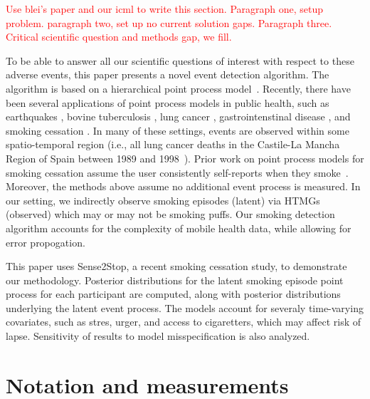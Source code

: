 \documentclass[11pt]{amsart}
\begin{document}
\textcolor{red}{Use blei's paper and our icml to write this
  section. Paragraph one, setup problem. paragraph two, set up no
  current solution gaps. Paragraph three. Critical scientific question
  and methods gap, we fill.}

To be able to answer all our scientific questions of interest with
respect to these adverse events, this paper presents a novel event
detection algorithm. The algorithm is based on a hierarchical point
process model~\cite{Blei, DempseyICML}.  Recently, there have been
several applications of point process models in public health, such as
earthquakes \cite{RevMCMCguys}, bovine tuberculosis
\cite{DiggleStatSci}, lung cancer \cite{DiggleStatSci},
gastrointenstinal disease \cite{DiggleStatSci}, and smoking cessation
\cite{MLHealth paper}.
In many of these settings, events are observed within some
spatio-temporal region (i.e., all lung cancer deaths in the Castile-La
Mancha Region of Spain between 1989 and 1998~\cite{DiggleStatSci}).
Prior work on point process models for smoking cessation assume the
user consistently self-reports when they smoke~\cite{MLHealth}.
Moreover, the methods above assume no additional event process is
measured.
In our setting, we indirectly observe smoking episodes (latent) via
HTMGs (observed) which may or may not be smoking puffs.
Our smoking detection algorithm accounts for the complexity of mobile
health data, while allowing for error propogation.

This paper uses Sense2Stop, a recent smoking cessation study, to
demonstrate our methodology.  Posterior distributions for the latent
smoking episode point process for each participant are computed, along
with posterior distributions underlying the latent event process.
The models account for severaly time-varying covariates, such as
stres, urger, and access to cigaretters, which may affect risk of
lapse. Sensitivity of results to model misspecification is also
analyzed.

\section{Notation and measurements}
\end{document}
